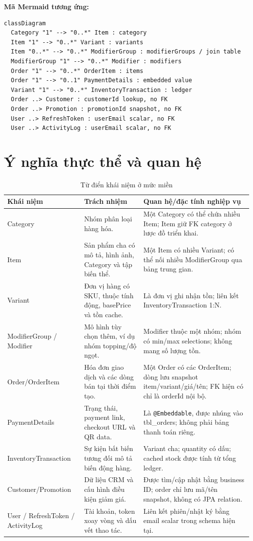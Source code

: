 \documentclass[12pt,a4paper,oneside]{report}
\begin{document}
\noindent\textbf{Mã Mermaid tương ứng:}
\begin{lstlisting}[style=mermaid,caption={Domain Model dưới dạng Mermaid classDiagram},label={lst:domain-mermaid}]
classDiagram
  Category "1" --> "0..*" Item : category
  Item "1" --> "0..*" Variant : variants
  Item "0..*" --> "0..*" ModifierGroup : modifierGroups / join table
  ModifierGroup "1" --> "0..*" Modifier : modifiers
  Order "1" --> "0..*" OrderItem : items
  Order "1" --> "0..1" PaymentDetails : embedded value
  Variant "1" --> "0..*" InventoryTransaction : ledger
  Order ..> Customer : customerId lookup, no FK
  Order ..> Promotion : promotionId snapshot, no FK
  User ..> RefreshToken : userEmail scalar, no FK
  User ..> ActivityLog : userEmail scalar, no FK
\end{lstlisting}

\section{Ý nghĩa thực thể và quan hệ}
\begin{table}[htbp]
\centering\small
\caption{Từ điển khái niệm ở mức miền}
\begin{tabularx}{\textwidth}{@{}p{3.0cm}p{4.0cm}Y@{}}\toprule
Khái niệm & Trách nhiệm & Quan hệ/đặc tính nghiệp vụ\\\midrule
Category & Nhóm phân loại hàng hóa. & Một Category có thể chứa nhiều Item; Item giữ FK category ở lược đồ triển khai.\\
Item & Sản phẩm cha có mô tả, hình ảnh, Category và tập biến thể. & Một Item có nhiều Variant; có thể nối nhiều ModifierGroup qua bảng trung gian.\\
Variant & Đơn vị hàng có SKU, thuộc tính động, basePrice và tồn cache. & Là đơn vị ghi nhận tồn; liên kết InventoryTransaction 1:N.\\
ModifierGroup / Modifier & Mô hình tùy chọn thêm, ví dụ nhóm topping/độ ngọt. & Modifier thuộc một nhóm; nhóm có min/max selections; không mang số lượng tồn.\\
Order/OrderItem & Hóa đơn giao dịch và các dòng bán tại thời điểm tạo. & Một Order có các OrderItem; dòng lưu snapshot item/variant/giá/tên; FK hiện có chỉ là orderId nội bộ.\\
PaymentDetails & Trạng thái, payment link, checkout URL và QR data. & Là \texttt{@Embeddable}, được nhúng vào tbl\_orders; không phải bảng thanh toán riêng.\\
Inventory\allowbreak Transaction & Sự kiện bất biến tương đối mô tả biến động hàng. & Variant cha; quantity có dấu; cached stock được tính từ tổng ledger.\\
Customer/Promotion & Dữ liệu CRM và cấu hình điều kiện giảm giá. & Được tìm/cập nhật bằng business ID; order chỉ lưu mã/tên snapshot, không có JPA relation.\\
User / RefreshToken / ActivityLog & Tài khoản, token xoay vòng và dấu vết thao tác. & Liên kết phiên/nhật ký bằng email scalar trong schema hiện tại.\\
\bottomrule\end{tabularx}
\end{table}
\end{document}
